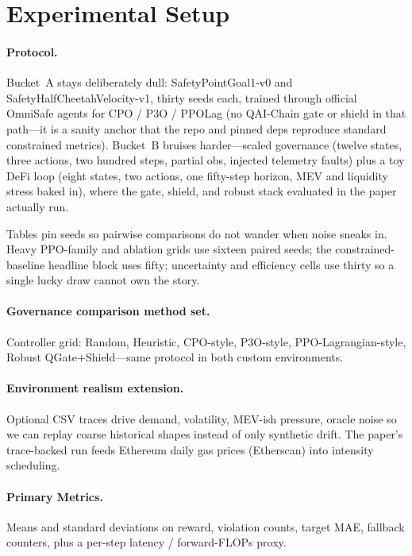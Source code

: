 \section{Experimental Setup}

\paragraph{Protocol.}
Bucket~A stays deliberately dull: SafetyPointGoal1-v0 and SafetyHalfCheetahVelocity-v1, thirty seeds each, trained through official OmniSafe agents for CPO / P3O / PPOLag (no QAI-Chain gate or shield in that path---it is a sanity anchor that the repo and pinned deps reproduce standard constrained metrics). Bucket~B bruises harder---scaled governance (twelve states, three actions, two hundred steps, partial obs, injected telemetry faults) plus a toy DeFi loop (eight states, two actions, one fifty-step horizon, MEV and liquidity stress baked in), where the gate, shield, and robust stack evaluated in the paper actually run.

Tables pin seeds so pairwise comparisons do not wander when noise sneaks in. Heavy PPO-family and ablation grids use sixteen paired seeds; the constrained-baseline headline block uses fifty; uncertainty and efficiency cells use thirty so a single lucky draw cannot own the story.

\paragraph{Governance comparison method set.}
Controller grid: Random, Heuristic, CPO-style, P3O-style, PPO-Lagrangian-style, Robust QGate+Shield---same protocol in both custom environments.

\paragraph{Environment realism extension.}
Optional CSV traces drive demand, volatility, MEV-ish pressure, oracle noise so we can replay coarse historical shapes instead of only synthetic drift. The paper's trace-backed run feeds Ethereum daily gas prices (Etherscan) into intensity scheduling.

\paragraph{Primary Metrics.}
Means and standard deviations on reward, violation counts, target MAE, fallback counters, plus a per-step latency / forward-FLOPs proxy.

